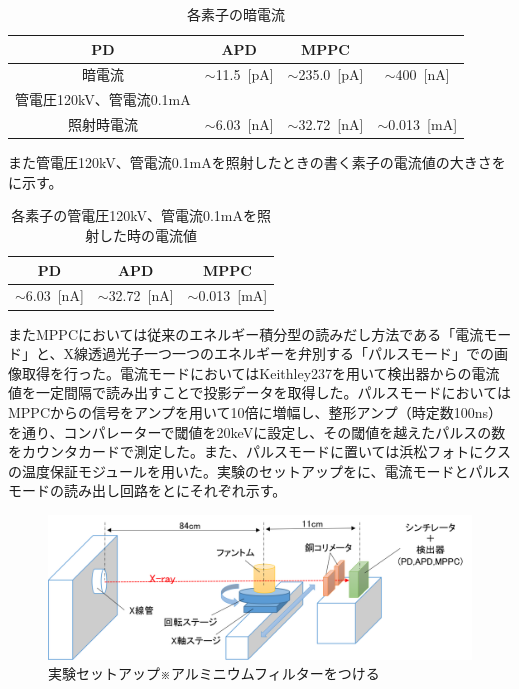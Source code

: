 \begin{table}[H]
  \centering
  \caption{各素子の暗電流}
    \begin{tabular}{cccc}
    \toprule
    PD    & APD   & MPPC \\
    \midrule
    暗電流&$\sim$11.5\ [pA] & $\sim$235.0\ [pA]  & $\sim$400\ [nA]  \\
     管電圧120kV、管電流0.1mA\\照射時電流&$\sim$6.03\ [nA] & $\sim$32.72\ [nA]  & $\sim$0.013\ [mA]  \\
    
    \bottomrule
    \end{tabular}%
  \label{tab:dark_current}%
\end{table}%

また管電圧120kV、管電流0.1mAを照射したときの書く素子の電流値の大きさをに示す。

\begin{table}[H]
  \centering
  \caption{各素子の管電圧120kV、管電流0.1mAを照射した時の電流値}
    \begin{tabular}{ccc}
    \toprule
    PD    & APD   & MPPC \\
    \midrule
    $\sim$6.03\ [nA] & $\sim$32.72\ [nA]  & $\sim$0.013\ [mA]  \\
    \bottomrule
    \end{tabular}%
  \label{tab:soshi_current}%
\end{table}%

\fi


またMPPCにおいては従来のエネルギー積分型の読みだし方法である「電流モード」と、X線透過光子一つ一つのエネルギーを弁別する「パルスモード」での画像取得を行った。電流モードにおいてはKeithley237を用いて検出器からの電流値を一定間隔で読み出すことで投影データを取得した。パルスモードにおいてはMPPCからの信号をアンプを用いて10倍に増幅し、整形アンプ（時定数100ns）を通り、コンパレーターで閾値を20keVに設定し、その閾値を越えたパルスの数をカウンタカードで測定した。また、パルスモードに置いては浜松フォトにクスの温度保証モジュールを用いた。実験のセットアップをに、電流モードとパルスモードの読み出し回路をとにそれぞれ示す。

\begin{figure}[H]
 \begin{center}
 \includegraphics[bb=0.000000 0.000000 625.388301 214.062304,width=0.8\hsize]{image2/chapter5/setup.png} 
 \end{center}
 \caption{実験セットアップ※アルミニウムフィルターをつける}
 \label{fig:CTsetup}
\end{figure}



